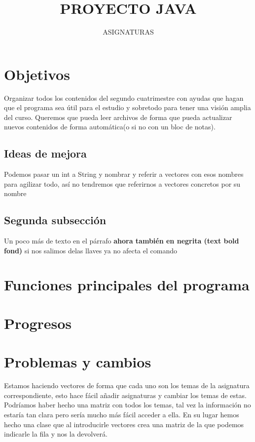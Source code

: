 \documentclass[]{article}
\title{PROYECTO JAVA}
\author{ASIGNATURAS}
\begin{document}
	
	\maketitle
	
	\begin{abstract}
		
	\end{abstract}
	
	\section{Objetivos}
	Organizar todos los contenidos del segundo cuatrimestre con ayudas que hagan que el programa sea útil para el estudio y sobretodo para tener una visión amplia del curso.
	Queremos que pueda leer archivos de forma que pueda actualizar nuevos contenidos de forma automática(o si no con un bloc de notas).
	
	\subsection{Ideas de mejora}
	Podemos pasar un int a String y nombrar y referir a vectores con esos nombres para agilizar todo, así no tendremos que referirnos a vectores concretos por su nombre
	\subsection{Segunda subsección}
	Un poco más de texto en el párrafo \textbf{ahora también en negrita (text bold fond)} si nos salimos delas llaves ya no afecta el comando
	
	\section{Funciones principales del programa}
	\section{Progresos}
	\section{Problemas y cambios}
	Estamos haciendo vectores de forma que cada uno son los temas de la asignatura correspondiente, esto hace fácil añadir asignaturas y cambiar los temas de estas. 
	Podríamos haber hecho una matriz con todos los temas, tal vez la información no estaría tan clara pero sería mucho más fácil acceder a ella. En su lugar hemos hecho una clase que al introducirle vectores crea una matriz de la que podemos indicarle la fila y nos la devolverá.
	
	
\end{document}
